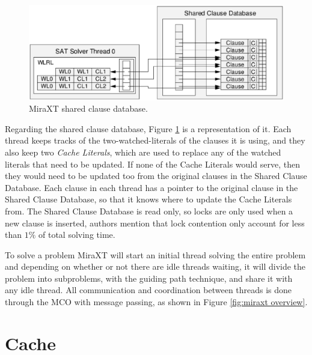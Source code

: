 \documentclass[12pt]{diicc}
\begin{document}
\begin{figure}[h!]
	\centering
		\includegraphics[scale=0.6]{miraxtdatabase}
	\caption{MiraXT shared clause database.}
	\label{fig:miraxt database}
\end{figure}

Regarding the shared clause database, Figure \ref{fig:miraxt database} is a representation of it. Each thread keeps tracks of the two-watched-literals of the clauses it is using, and they also keep two \textit{Cache Literals}, which are used to replace any of the watched literals that need to be updated. If none of the Cache Literals would serve, then they would need to be updated too from the original clauses in the Shared Clause Database. Each clause in each thread has a pointer to the original clause in the Shared Clause Database, so that it knows where to update the Cache Literals from. The Shared Clause Database is read only, so locks are only used when a new clause is inserted, authors mention that lock contention only account for less than $1\%$ of total solving time.

To solve a problem MiraXT will start an initial thread solving the entire problem and depending on whether or not there are idle threads waiting, it will divide the problem into subproblems, with the guiding path technique, and share it with any idle thread. All communication and coordination between threads is done through the MCO with message passing, as shown in Figure \ref{fig:miraxt overview}. 

\section{Cache}
\end{document}
